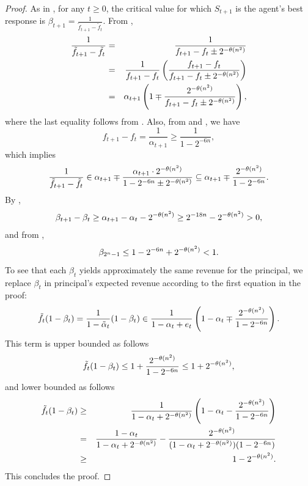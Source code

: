 \documentclass[11pt]{article}
\newcommand{\tf}{\tilde{f}}
\newcommand{\talpha}{\tilde{\alpha}}
\begin{document}
\begin{proof}
    As in , for any $t \ge 0$, the critical value for which $S_{t+1}$ is the agent's best response is $\beta_{t+1} = \frac{1}{\tf_{t+1} - \tf_t}$.
    From ,
    \begin{eqnarray*}
        \frac{1}{\tf_{t+1} - \tf_t}
        &=&
        \frac{1}{f_{t+1} - f_t \pm 2^{-\tn}} \\
        &=&
        \frac{1}{f_{t+1} - f_t} \left(\frac{f_{t+1} - f_t}{f_{t+1} - f_t \pm 2^{-\tn}}\right) \\
        &=&
        \alpha_{t+1} \left(1 \mp \frac{2^{-\tn}}{f_{t+1} - f_t \pm 2^{-\tn}}\right),
    \end{eqnarray*}
    where the last equality follows from .
    Also, from  and , we have
    $$
    f_{t+1} - f_t = \frac{1}{\alpha_{t+1}} \ge \frac{1}{1-2^{-6n}},
    $$
    which implies
    $$
    \frac{1}{\tf_{t+1} - \tf_t} 
    \in 
    \alpha_{t+1} \mp  \frac{\alpha_{t+1} \cdot 2^{-\tn}}{1-2^{-6n} \pm 2^{-\tn}}
    \subseteq
    \alpha_{t+1} \mp  \frac{2^{-\tn}}{1-2^{-6n}}.
    $$
    By , 
    $$
    \beta_{t+1} - \beta_t 
    \ge \alpha_{t+1} - \alpha_t -2^{-\theta(n^2)} 
    \ge 2^{-18n} -2^{-\theta(n^2)} 
    > 0,
    $$
    and from ,
    $$
    \beta_{2^n-1} \le 1- 2^{-6n} + 2^{-\theta(n^2)} < 1.
    $$
    To see that each $\beta_t$ yields approximately the same revenue for the principal, we replace $\beta_t$ in principal's expected revenue according to the first equation in the proof:
\begin{eqnarray*}
    \tf_t(1-\beta_t) 
    =
    \frac{1}{1-\talpha_t}(1-\beta_t) 
    \in
    \frac{1}{1-\alpha_t + e_t}\left(1-\alpha_{t} \mp  \frac{2^{-\tn}}{1-2^{-6n}}\right). 
\end{eqnarray*}
This term is upper bounded as follows
\begin{eqnarray*}
    \tf_t(1-\beta_t) 
    \le
    1 + \frac{2^{-\tn}}{1-2^{-6n}} 
    \le
    1 + 2^{-\tn},
\end{eqnarray*}
and lower bounded as follows
\begin{eqnarray*}
    \tf_t(1-\beta_t) 
    &\ge&
    \frac{1}{1-\alpha_t + 2^{-\tn}}
    \left(1-\alpha_{t} - \frac{2^{-\tn}}{1-2^{-6n}} \right) \\
    &=&
    \frac{1-\alpha_{t}}{1-\alpha_t + 2^{-\tn}}
    -
    \frac{2^{-\tn}}{(1-\alpha_t+2^{-\tn})(1-2^{-6n})} \\
    &\ge&
    1 - 2^{-\tn}.
\end{eqnarray*}
This concludes the proof.
\end{proof}
\end{document}
